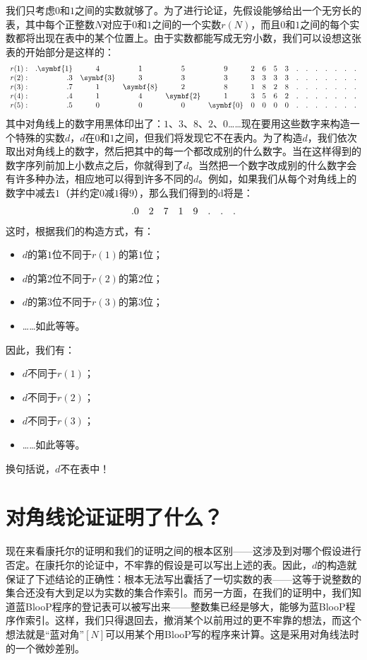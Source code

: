 我们只考虑$0$和$1$之间的实数就够了。为了进行论证，先假设能够给出一个无穷长的表，其中每个正整数$N$对应于$0$和$1$之间的一个实数$r(N)$，而且$0$和$1$之间的每个实数都将出现在表中的某个位置上。由于实数都能写成无穷小数，我们可以设想这张表的开始部分是这样的：
\[
\begin{array}{rr*{15}c}
r(1):&.\symbf{1}&4&1&5&9&2&6&5&3&.&.&.&.&.&.&.\\
r(2):&.3&\symbf{3}&3&3&3&3&3&3&3&.&.&.&.&.&.&.\\
r(3):&.7&1&\symbf{8}&2&8&1&8&2&8&.&.&.&.&.&.&.\\
r(4):&.4&1&4&\symbf{2}&1&3&5&6&2&.&.&.&.&.&.&.\\
r(5):&.5&0&0&0&\symbf{0}&0&0&0&0&.&.&.&.&.&.&.
\end{array}
\]
其中对角线上的数字用黑体印出了：$1$、$3$、$8$、$2$、$0$……现在要用这些数字来构造一个特殊的实数$d$，$d$在$0$和$1$之间，但我们将发现它不在表内。为了构造$d$，我们依次取出对角线上的数字，然后把其中的每一个都改成别的什么数字。当在这样得到的数字序列前加上小数点之后，你就得到了$d$。当然把一个数字改成别的什么数字会有许多种办法，相应地可以得到许多不同的$d$。例如，如果我们从每个对角线上的数字中减去$1$（并约定$0$减$1$得$9$），那么我们得到的d将是：
\[
\begin{array}{*8l}
.0&2&7&1&9&.&.&.
\end{array}
\]
这时，根据我们的构造方式，有：
\begin{itemize}
\item $d$的第$1$位不同于$r(1)$的第$1$位；
\item $d$的第$2$位不同于$r(2)$的第$2$位；
\item $d$的第$3$位不同于$r(3)$的第$3$位；
\item ……如此等等。
\end{itemize}
因此，我们有：
\begin{itemize}
\item $d$不同于$r(1)$；
\item $d$不同于$r(2)$；
\item $d$不同于$r(3)$；
\item ……如此等等。
\end{itemize}
换句括说，$d$不在表中！

\section{对角线论证证明了什么？}

现在来看康托尔的证明和我们的证明之间的根本区别——这涉及到对哪个假设进行否定。在康托尔的论证中，不牢靠的假设是可以写出上述的表。因此，$d$的构造就保证了下述结论的正确性：根本无法写出囊括了一切实数的表——这等于说整数的集合还没有大到足以为实数的集合作索引。而另一方面，在我们的证明中，我们知道蓝BlooP程序的登记表可以被写出来——整数集已经是够大，能够为蓝BlooP程序作索引。这样，我们只得退回去，撤消某个以前用过的更不牢靠的想法，而这个想法就是“蓝对角”$[N]$可以用某个用BlooP写的程序来计算。这是采用对角线法时的一个微妙差别。

